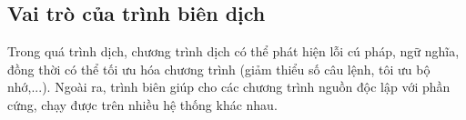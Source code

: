 \subsection{Vai trò của trình biên dịch}
Trong quá trình dịch, chương trình dịch có 
thể phát hiện lỗi cú pháp, ngữ nghĩa, đồng thời có thể tối ưu hóa chương
trình (giảm thiểu số câu lệnh, tôi ưu bộ nhớ,...). Ngoài ra, trình biên
giúp cho các chương trình nguồn độc lập với phần cứng, chạy được trên
nhiều hệ thống khác nhau.